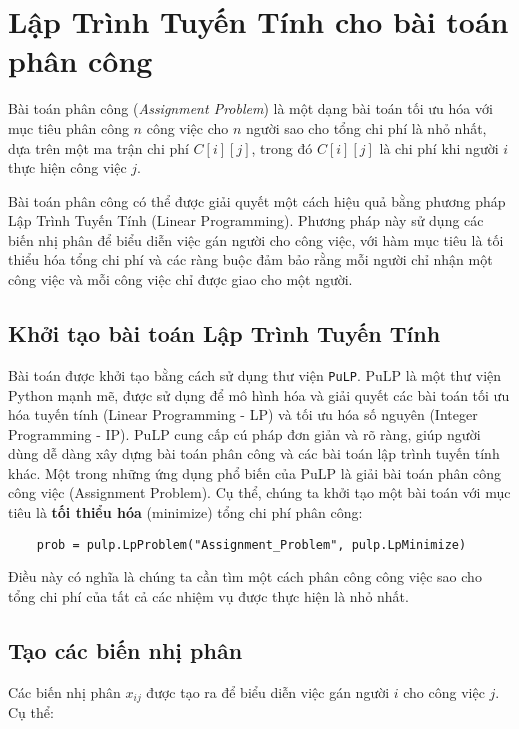 \section{Lập Trình Tuyến Tính cho bài toán phân công}

Bài toán phân công (\textit{Assignment Problem}) là một dạng bài toán tối ưu hóa với mục tiêu phân công \(n\) công việc cho \(n\) người sao cho tổng chi phí là nhỏ nhất, dựa trên một ma trận chi phí \(C[i][j]\), trong đó \(C[i][j]\) là chi phí khi người \(i\) thực hiện công việc \(j\).

Bài toán phân công có thể được giải quyết một cách hiệu quả bằng phương pháp Lập Trình Tuyến Tính (Linear Programming). Phương pháp này sử dụng các biến nhị phân để biểu diễn việc gán người cho công việc, với hàm mục tiêu là tối thiểu hóa tổng chi phí và các ràng buộc đảm bảo rằng mỗi người chỉ nhận một công việc và mỗi công việc chỉ được giao cho một người.

\subsection{Khởi tạo bài toán Lập Trình Tuyến Tính}

Bài toán được khởi tạo bằng cách sử dụng thư viện \texttt{PuLP}.
PuLP là một thư viện Python mạnh mẽ,
được sử dụng để mô hình hóa và giải quyết các bài toán tối ưu hóa tuyến tính
(Linear Programming - LP) và tối ưu hóa số nguyên (Integer Programming - IP).
PuLP cung cấp cú pháp đơn giản và rõ ràng,
giúp người dùng dễ dàng xây dựng bài toán phân công và các bài toán lập trình tuyến tính khác.
Một trong những ứng dụng phổ biến của PuLP là giải bài toán phân công công việc (Assignment Problem).
Cụ thể, chúng ta khởi tạo một bài toán với mục tiêu là \textbf{tối thiểu hóa} (minimize) tổng chi phí phân công:

\begin{verbatim}
    prob = pulp.LpProblem("Assignment_Problem", pulp.LpMinimize)
\end{verbatim}

Điều này có nghĩa là chúng ta cần tìm một cách phân công công việc sao cho tổng chi phí của tất cả các nhiệm vụ được thực hiện là nhỏ nhất.

\subsection{Tạo các biến nhị phân}

Các biến nhị phân \(x_{ij}\) được tạo ra để biểu diễn việc gán người \(i\) cho công việc \(j\). Cụ thể:

